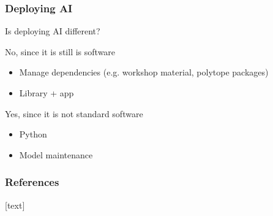 \begin{frame}
\frametitle{Deploying AI}

Is deploying AI different?\newline

No, since it is still is software
\begin{itemize}
\item Manage dependencies (e.g. workshop material, polytope packages)
\item Library + app
\end{itemize}

Yes, since it is not standard software
\begin{itemize}
    \item Python
    \item Model maintenance
\end{itemize}
\end{frame}


\begin{frame}[allowframebreaks]
    \frametitle{References}
    [text]
    
    
\end{frame}

